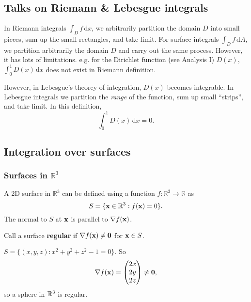 \subsection*{Talks on Riemann \& Lebesgue integrals}
In Riemann integrals $ \int_{D} f \,\mathrm{d}x $, we arbitrarily partition the domain $D$ into small pieces, sum up the small rectangles, and take limit. For surface integrals $ \int_{D} f \,\mathrm{d}A $, we partition arbitrarily the domain $D$ and carry out the same process. However, it has lots of limitations. e.g. for the Dirichlet function (see Analysis I) $D(x)$, $ \int_{0}^{1} D(x) \,\mathrm{d}x $ does not exist in Riemann definition.

However, in Lebesgue's theorey of integration, $D(x)$ becomes integrable. In Lebesgue integrals we partition the \textit{range} of the function, sum up small ``strips'', and take limit. In this definition,
\[
    \int_{0}^{1} D(x) \,\mathrm{d}x=0.
\]

\subsection{Integration over surfaces}
\subsubsection*{Surfaces in $ \mathbb{R}^{3} $}
A 2D surface in $ \mathbb{R}^{3} $ can be defined using a function $ f: \mathbb{R}^{3}\to \mathbb{R}  $ as 
\[
    S = \{{\bf x}\in \mathbb{R}^{3}:f({\bf x})=0\}.
\]
The normal to $S$ at ${\bf x}$ is parallel to $ \nabla f({\bf x}) $. 
\begin{definition}
    Call a surface \textbf{regular} if $ \nabla f({\bf x})\neq \mathbf{0} $ for $ {\bf x}\in S $.
\end{definition}

\begin{example}
    $ S = \{(x,y,z):x^2+y^2+z^2-1=0\} $. So 
    \[
        \nabla f({\bf x}) = \begin{pmatrix}
            2x \\ 2y \\ 2z
        \end{pmatrix}\neq \mathbf{0},
    \]
    so a sphere in ${\mathbb{R}}^3$ is regular.
\end{example}

